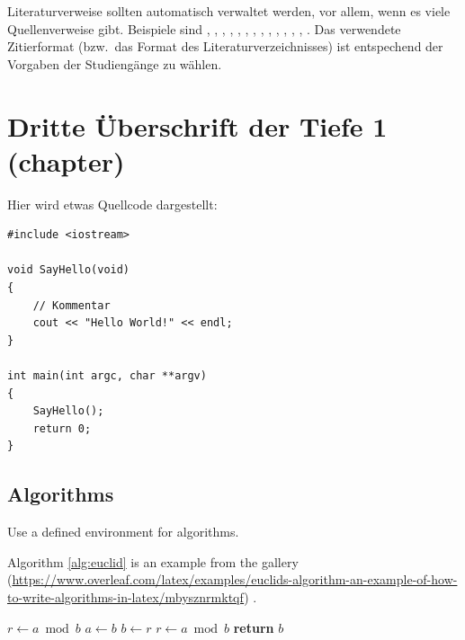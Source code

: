 \documentclass[Master,BMR,english]{BASE/twbook}
\begin{document}
Literaturverweise sollten automatisch verwaltet werden, vor allem, wenn es viele Quellenverweise gibt. Beispiele sind  \cite{Ko05a}, \cite{Ko05b}, \cite{MiGo05}, \cite{TeGo14}, \cite{HuHa07}, \cite{HuZi10}, \cite{ZiKu07}, \cite{He07}, \cite{SIE11}, \cite{SIE14}, \cite{ISO98}, \cite{ATM11}, \cite{Hu11}, \cite{Po10}. Das verwendete Zitierformat (bzw.~das Format des Literaturverzeichnisses) ist entspechend der Vorgaben der Studiengänge zu wählen.
\chapter{Dritte Überschrift der Tiefe 1 (chapter)}
Hier wird etwas Quellcode dargestellt:
\begin{listing}[htbp]
\begin{verbatim}
#include <iostream>

void SayHello(void)
{
    // Kommentar
    cout << "Hello World!" << endl;
}

int main(int argc, char **argv)
{
    SayHello();
    return 0;
}
\end{verbatim}
\caption{Hello-World}
\end{listing}


\section{Algorithms}


Use a defined environment for algorithms.

Algorithm \ref{alg:euclid} is an example from the gallery (\url{https://www.overleaf.com/latex/examples/euclids-algorithm-an-example-of-how-to-write-algorithms-in-latex/mbysznrmktqf}) .
\begin{algorithm}
\caption{Euclid’s algorithm}\label{alg:euclid}
\begin{algorithmic}[1]
\State $r\gets a\bmod b$
\State $a\gets b$
\State $b\gets r$
\State $r\gets a\bmod b$
\EndWhile\label{euclidendwhile}
\State \textbf{return} $b$
\EndProcedure
\end{algorithmic}
\end{algorithm}
\clearpage                                                       %
\end{document}

